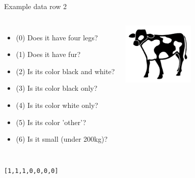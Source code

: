 \documentclass[15pt]{beamer}
\begin{document}
\begin{frame}{Example data row 2}
    \begin{columns}[b]
        \small
        \begin{itemize}\itemsep0.25em
            \item (0) Does it have four legs?
            \item (1) Does it have fur?
            \item (2) Is its color black and white?
            \item (3) Is its color black only?
            \item (4) Is its color white only?
            \item (5) Is its color 'other'?
            \item (6) Is it small (under 200kg)?
        \end{itemize}
        \includegraphics[height=30mm]{img/cow_2.png}
    \end{columns}

    \vspace{6mm}
    \normalsize
    \hspace{68mm}\texttt{[1,1,1,0,0,0,0]}
\end{frame}
\end{document}
